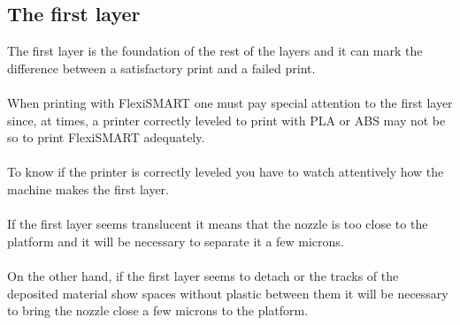 \documentclass[11pt,a4paper]{article}
\begin{document}
	\subsection{The first layer}
The first layer is the foundation of the rest of the layers and it can mark the difference between a satisfactory print and a failed print.
\\\\
When printing with FlexiSMART one must pay special attention to the first layer since, at times, a printer correctly leveled to print with PLA or ABS may not be so to print FlexiSMART adequately.
\\\\
To know if the printer is correctly leveled you have to watch attentively how the machine makes the first layer.
\\\\
If the first layer seems translucent it means that the nozzle is too close to the platform and it will be necessary to separate it a few microns.
\\\\
On the other hand, if the first layer seems to detach or the tracks of the deposited material show spaces without plastic between them it will be necessary to bring the nozzle close a few microns to the platform.
\end{document}
